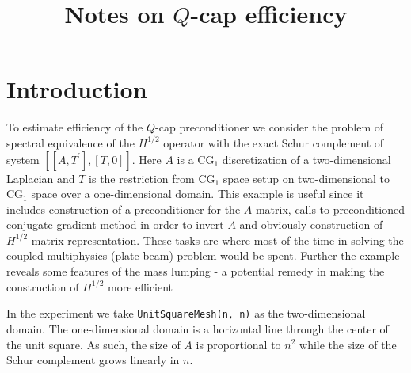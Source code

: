 \documentclass[10pt, a4paper]{article}
\title{Notes on $Q$-cap efficiency}
\newcommand{\dual}[1]{\ensuremath{{#1}^{\prime}}}
\begin{document}
\maketitle

\section*{Introduction}
To estimate efficiency of the $Q$-cap preconditioner we consider the problem of
spectral equivalence of the $H^{1/2}$ operator with the exact Schur complement of 
system $\left[\left[A, \dual{T}\right], \left[T, 0\right]\right]$. Here $A$ is a 
CG$_1$ discretization of a two-dimensional Laplacian and $T$ is the restriction from
CG$_1$ space setup on two-dimensional to CG$_1$ space over a
one-dimensional domain. This example is useful since it includes construction of 
a preconditioner for the $A$ matrix, calls to preconditioned conjugate gradient 
method in order to invert $A$ and obviously construction of $H^{1/2}$ matrix
representation. These tasks are where most of the time in solving the coupled
multiphysics (plate-beam) problem would be spent. Further the example reveals some
features of the mass lumping - a potential remedy in making the construction of
$H^{1/2}$ more efficient

In the experiment we take \texttt{UnitSquareMesh(n, n)} as the two-dimensional 
domain. The one-dimensional domain is a horizontal line through the center of the 
unit square. As such, the size of $A$ is proportional to $n^2$ while the size of
the Schur complement grows linearly in $n$.
\end{document}
